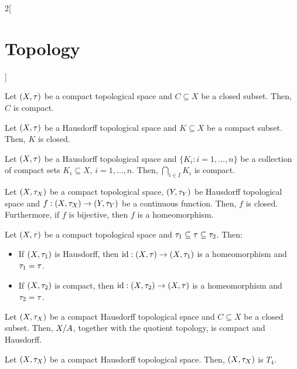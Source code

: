 \documentclass[../../../main.tex]{subfiles}
\begin{document}
\begin{multicols}{2}[\section{Topology}]
\begin{theorem}
  \end{theorem}
  \begin{theorem}
    Let $(X,\tau)$ be a compact topological space and $C\subseteq X$ be a closed subset. Then, $C$ is compact.
  \end{theorem}
  \begin{theorem}
    Let $(X,\tau)$ be a Hausdorff topological space and $K\subseteq X$ be a compact subset. Then, $K$ is closed.
  \end{theorem}
  \begin{corollary}
    Let $(X,\tau)$ be a Hausdorff topological space and $\{K_i:i=1,\ldots,n\}$ be a collection of compact sets $K_i\subseteq X$, $i=1,\ldots,n$. Then, $\bigcap_{i\in I}K_i$ is compact.
  \end{corollary}
  \begin{corollary}
    Let $(X,\tau_X)$ be a compact topological space, $(Y,\tau_Y)$ be Hausdorff topological space and $f:(X,\tau_X)\rightarrow(Y,\tau_Y)$ be a continuous function. Then, $f$ is closed. Furthermore, if $f$ is bijective, then $f$ is a homeomorphism.
  \end{corollary}
  \begin{corollary}
    Let $(X,\tau)$ be a compact topological space and $\tau_1\subseteq\tau\subseteq\tau_2$. Then:
    \begin{itemize}
      \item If $(X,\tau_1)$ is Hausdorff, then $\mathrm{id}:(X,\tau)\rightarrow(X,\tau_1)$ is a homeomorphism and $\tau_1=\tau$.
      \item If $(X,\tau_2)$ is compact, then $\mathrm{id}:(X,\tau_2)\rightarrow(X,\tau)$ is a homeomorphism and $\tau_2=\tau$.
    \end{itemize}
  \end{corollary}
  \begin{prop}
    Let $(X,\tau_X)$ be a compact Hausdorff topological space and $C\subseteq X$ be a closed subset. Then, $\quot{X}{A}$, together with the quotient topology, is compact and Hausdorff.
  \end{prop}
  \begin{prop}
    Let $(X,\tau_X)$ be a compact Hausdorff topological space. Then, $(X,\tau_X)$ is $T_4$.
  \end{prop}

\end{multicols}
\end{document}
